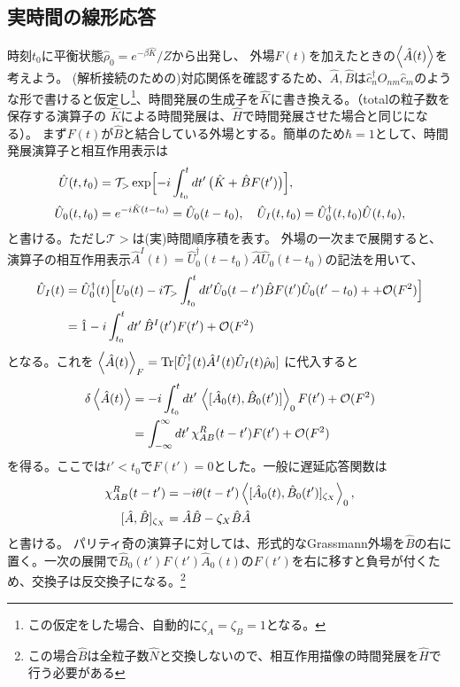 \documentclass[a4paper,12pt]{jsarticle}
\begin{document}
\subsection{実時間の線形応答}
時刻$t_0$に平衡状態$\hat\rho_0=e^{-\beta\hat K}/Z$から出発し、
外場$F(t)$を加えたときの$\ev{\hat A(t)}$を考えよう。
(解析接続のための)対応関係を確認するため、$\hat{A}, \hat{B}$は$\hat{c}^\dagger_{n} O_{nm}\hat{c}_m$のような形で書けると仮定し\footnote{この仮定をした場合、自動的に$\zeta_A = \zeta_B = 1$となる。}、時間発展の生成子を$\hat K$に書き換える。（totalの粒子数を保存する演算子の
$\hat{K}$による時間発展は、$\hat H$で時間発展させた場合と同じになる）。
まず$F(t)$が$\hat{B}$と結合している外場とする。簡単のため$\hbar=1$として、時間発展演算子と相互作用表示は
\begin{align}
  \hat U(t, t_0)&=\mathcal T_>\exp\Bigl[-i\int_{t_0}^{t}dt'\,
                       \bigl(\hat K+\hat B F(t')\bigr)\Bigr],\\
  \hat U_0(t, t_0)&=e^{-i\hat K(t-t_0)} = \hat U_0(t - t_0),\quad
  \hat U_I(t, t_0)=\hat U_0^\dagger(t, t_0)\hat U(t, t_0),
\end{align}
と書ける。ただし$\mathcal T>$は(実)時間順序積を表す。
外場の一次まで展開すると、演算子の相互作用表示$\hat A^I(t)=\hat U_0^\dagger(t-t_0)\hat A\hat U_0(t-t_0)$の記法を用いて、
\begin{align}
  \hat U_I(t) &= \hat{U}_0^{\dagger}(t)\Bigl[U_0(t) -i \mathcal{T}_>\int_{t_0}^{t} dt'\hat{U}_0(t-t')\hat{B} F(t') \hat{U}_0(t'-t_0) +  +\mathcal O(F^2) \Bigr]\\
        &=\hat 1-i\int_{t_0}^{t}dt'\,\hat B^I(t')F(t')+\mathcal O(F^2)
\end{align}
となる。これを
$\ev{\hat A(t)}_F=\mathrm{Tr}[\hat U_I^\dagger(t)\hat A^I(t)\hat U_I(t)\hat\rho_0]$
に代入すると
\begin{align}
  \delta\ev{\hat A(t)}
   &= -i\int_{t_0}^{t}dt'\,
       \ev{[\hat A_0(t),\hat B_0(t')]}_0F(t')+\mathcal O(F^2)\\
   &=\int_{-\infty}^{\infty} dt'\,\chi^R_{AB}(t-t')F(t')+\mathcal O(F^2)
\end{align}
を得る。ここでは$t'<t_0$で$F(t')=0$とした。一般に遅延応答関数は
\begin{align}
  \chi^R_{AB}(t-t')
    &=-i\theta(t-t')\ev{[\hat A_0(t),\hat B_0(t')]_{\zeta_X}}_0,\\
  [\hat A,\hat B]_{\zeta_X}&=\hat A\hat B-\zeta_X\hat B\hat A
\end{align}
と書ける。
パリティ奇の演算子に対しては、形式的なGrassmann外場を$\hat B$の右に置く。一次の展開で$\hat B_0(t')F(t')\hat A_0(t)$の$F(t')$を右に移すと負号が付くため、交換子は反交換子になる。\footnote{この場合$\hat{B}$は全粒子数$\hat{N}$と交換しないので、相互作用描像の時間発展を$\hat{H}$で行う必要がある}
\end{document}
